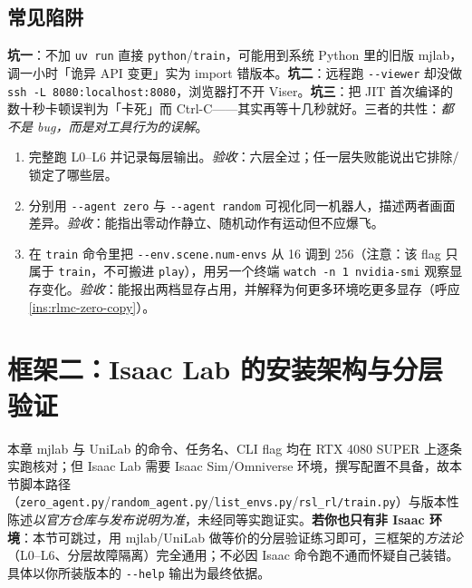 \subsection{常见陷阱}

\begin{pitfall}
\textbf{坑一}：不加 \verb|uv run| 直接 \verb|python|/\verb|train|，可能用到系统 Python 里的旧版 mjlab，调一小时「诡异 API 变更」实为 import 错版本。\textbf{坑二}：远程跑 \verb|--viewer| 却没做 \verb|ssh -L 8080:localhost:8080|，浏览器打不开 Viser。\textbf{坑三}：把 JIT 首次编译的数十秒卡顿误判为「卡死」而 Ctrl-C——其实再等十几秒就好。三者的共性：\emph{都不是 bug，而是对工具行为的误解}。
\end{pitfall}

\begin{practice}
\begin{enumerate}
  \item 完整跑 L0--L6 并记录每层输出。\emph{验收}：六层全过；任一层失败能说出它排除/锁定了哪些层。
  \item 分别用 \verb|--agent zero| 与 \verb|--agent random| 可视化同一机器人，描述两者画面差异。\emph{验收}：能指出零动作静立、随机动作有运动但不应爆飞。
  \item 在 \verb|train| 命令里把 \verb|--env.scene.num-envs| 从 16 调到 256（注意：该 flag 只属于 \verb|train|，不可搬进 \verb|play|），用另一个终端 \verb|watch -n 1 nvidia-smi| 观察显存变化。\emph{验收}：能报出两档显存占用，并解释为何更多环境吃更多显存（呼应 \cref{ins:rlmc-zero-copy}）。
\end{enumerate}
\end{practice}

\section{框架二：Isaac Lab 的安装架构与分层验证}
\label{sec:rlmc-setup-isaaclab}

\begin{note}
本章 mjlab 与 UniLab 的命令、任务名、CLI flag 均在 RTX 4080 SUPER 上逐条实跑核对；但 Isaac Lab 需要 Isaac Sim/Omniverse 环境，撰写配置不具备，故本节脚本路径（\verb|zero_agent.py|/\verb|random_agent.py|/\verb|list_envs.py|/\verb|rsl_rl/train.py|）与版本性陈述\emph{以官方仓库与发布说明为准}，未经同等实跑证实。\textbf{若你也只有非 Isaac 环境}：本节可跳过，用 mjlab/UniLab 做等价的分层验证练习即可，三框架的\emph{方法论}（L0--L6、分层故障隔离）完全通用；不必因 Isaac 命令跑不通而怀疑自己装错。具体以你所装版本的 \verb|--help| 输出为最终依据。
\end{note}

